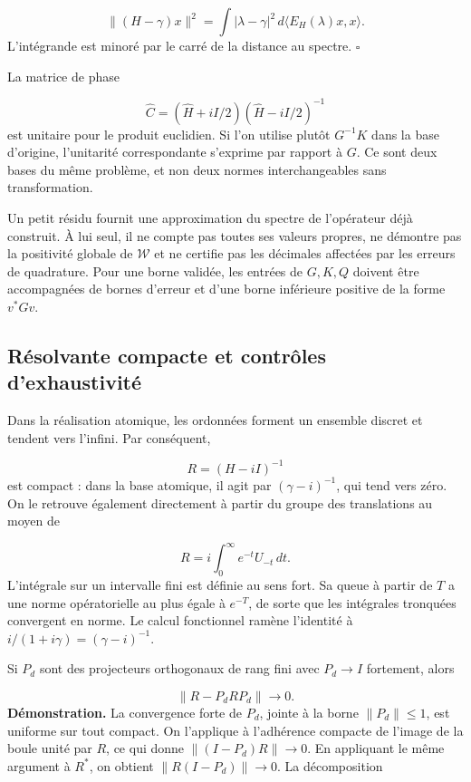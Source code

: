 \[
\|(H-\gamma)x\|^2
=\int |\lambda-\gamma|^2\,d\langle E_H(\lambda)x,x\rangle.
\]
L'intégrande est minoré par le carré de la distance au spectre. \hfill\(\square\)

La matrice de phase

\[
\widehat C=(\widehat H+iI/2)(\widehat H-iI/2)^{-1}
\]
est unitaire pour le produit euclidien. Si l'on utilise plutôt \(G^{-1}K\) dans la base d'origine, l'unitarité correspondante s'exprime par rapport à \(G\). Ce sont deux bases du même problème, et non deux normes interchangeables sans transformation.

Un petit résidu fournit une approximation du spectre de l'opérateur déjà construit. À lui seul, il ne compte pas toutes ses valeurs propres, ne démontre pas la positivité globale de \(\mathscr W\) et ne certifie pas les décimales affectées par les erreurs de quadrature. Pour une borne validée, les entrées de \(G,K,Q\) doivent être accompagnées de bornes d'erreur et d'une borne inférieure positive de la forme \(v^*Gv\).

\subsection{Résolvante compacte et contrôles d’exhaustivité}
\label{viii:rz:resolvente}
Dans la réalisation atomique, les ordonnées forment un ensemble discret et tendent vers l’infini. Par conséquent,

\[
R=(H-iI)^{-1}
\]
est compact : dans la base atomique, il agit par \((\gamma-i)^{-1}\), qui tend vers zéro. On le retrouve également directement à partir du groupe des translations au moyen de

\[
R=i\int_0^\infty e^{-t}U_{-t}\,dt.
\]
L’intégrale sur un intervalle fini est définie au sens fort. Sa queue à partir de \(T\) a une norme opératorielle au plus égale à \(e^{-T}\), de sorte que les intégrales tronquées convergent en norme. Le calcul fonctionnel ramène l’identité à \(i/(1+i\gamma)=(\gamma-i)^{-1}\).

Si \(P_d\) sont des projecteurs orthogonaux de rang fini avec \(P_d\to I\) fortement, alors

\[
\|R-P_dRP_d\|\longrightarrow0.
\]
\textbf{Démonstration.} La convergence forte de \(P_d\), jointe à la borne \(\|P_d\|\leq1\), est uniforme sur tout compact. On l’applique à l’adhérence compacte de l’image de la boule unité par \(R\), ce qui donne \(\|(I-P_d)R\|\to0\). En appliquant le même argument à \(R^*\), on obtient \(\|R(I-P_d)\|\to0\). La décomposition

